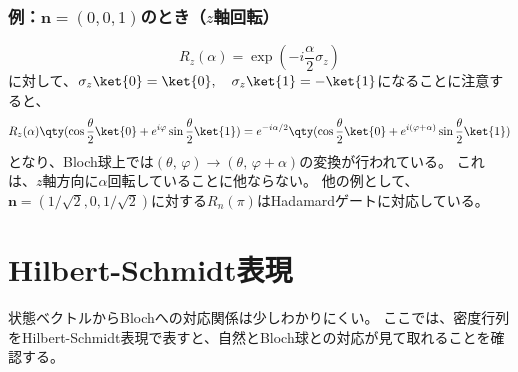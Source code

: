 \documentclass[a4paper,11pt,uplatex]{jsarticle}%
\begin{document}
\subsubsection*{例：$\bm{n}=(0,0,1)$のとき（$z$軸回転）}
\begin{equation}
  R_z(\alpha)=\exp(-i\frac{\alpha}{2}\sigma_z)
\end{equation}
に対して、$\sigma_z\ket{0}=\ket{0},\quad\sigma_z\ket{1}=-\ket{1}$になることに注意すると、
\begin{equation}
  R_z(\alpha)\qty(\cos\frac{\theta}{2}\ket{0} + e^{i\varphi}\sin\frac{\theta}{2}\ket{1}) 
  = e^{-i\alpha/2}\qty(\cos\frac{\theta}{2}\ket{0} + e^{i(\varphi+\alpha)}\sin\frac{\theta}{2}\ket{1}) 
\end{equation}
となり、Bloch球上では$(\theta,\,\varphi)\rightarrow(\theta,\,\varphi+\alpha)$の変換が行われている。
これは、$z$軸方向に$\alpha$回転していることに他ならない。
他の例として、$\bm{n}=(1/\sqrt{2},0,1/\sqrt{2})$に対する$R_{n}(\pi)$はHadamardゲートに対応している。

\newpage
\section{Hilbert-Schmidt表現}
状態ベクトルからBlochへの対応関係は少しわかりにくい。
ここでは、密度行列をHilbert-Schmidt表現で表すと、自然とBloch球との対応が見て取れることを確認する。
\end{document}
